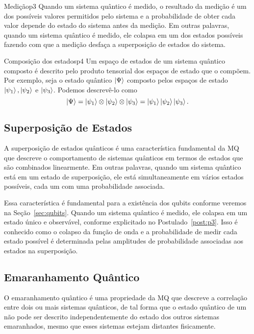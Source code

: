 \begin{post}{Medição}{p3}
Quando um sistema quântico é medido, o resultado da medição é um dos possíveis valores permitidos pelo sistema e a probabilidade de obter cada valor depende do estado do sistema antes da medição. Em outras palavras, quando um sistema quântico é medido, ele colapsa em um dos estados possíveis fazendo com que a medição desfaça a superposição de estados do sistema. 
\end{post}

\begin{post}{Composição dos estados}{p4}
Um espaço de estados de um sistema quântico composto é descrito pelo produto tensorial dos espaços de estado que o compõem. Por exemplo, seja o estado quântico $\ket{\Psi}$ composto pelos espaços de estado $\ket{\psi_1}, \ket{\psi_2}$ e $\ket{\psi_3}$. Podemos descrevê-lo como
\begin{equation}
  \ket{\Psi}=\ket{\psi_1} \otimes \ket{\psi_2} \otimes \ket{\psi_3} = \ket{\psi_1}\ket{\psi_2}\ket{\psi_3}.
\end{equation}
\end{post}

\subsection{Superposição de Estados}\label{sec:superposição}

A superposição de estados quânticos é uma característica fundamental da MQ que descreve o comportamento de sistemas quânticos em termos de estados que são combinados linearmente. Em outras palavras, quando um sistema quântico está em um estado de superposição, ele está simultaneamente em vários estados possíveis, cada um com uma probabilidade associada.

Essa característica é fundamental para a existência dos qubits conforme veremos na Seção~\ref{sec:qubits}. Quando um sistema quântico é medido, ele colapsa em um estado único e observável, conforme explicitado no Postulado~\ref{post:p3}. Isso é conhecido como o colapso da função de onda e a probabilidade de medir cada estado possível é determinada pelas amplitudes de probabilidade associadas aos estados na superposição.

\subsection{Emaranhamento Quântico}\label{sec:emaranhamento}

O emaranhamento quântico é uma propriedade da MQ que descreve a correlação entre dois ou mais sistemas quânticos, de tal forma que o estado quântico de um  não pode ser descrito independentemente do estado dos outros sistemas emaranhados, mesmo que esses sistemas estejam distantes fisicamente.

